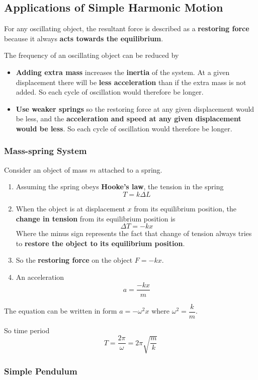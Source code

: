 \subsection{Applications of Simple Harmonic Motion}

For any oscillating object, the resultant force is described as a \textbf{restoring force} because it always \textbf{acts towards the equilibrium}.

The frequency of an oscillating object can be reduced by
\begin{itemize}
    \item \textbf{Adding extra mass} increases the \textbf{inertia} of the system. At a given displacement there will be \textbf{less acceleration} than if the extra mass is not added. So each cycle of oscillation would therefore be longer.
    \item \textbf{Use weaker springs} so the restoring force at any given displacement would be less, and the \textbf{acceleration and speed at any given displacement would be less}. So each cycle of oscillation would therefore be longer.
\end{itemize}

\subsubsection*{Mass-spring System}

Consider an object of mass $m$ attached to a spring.
\begin{enumerate}
    \item Assuming the spring obeys \textbf{Hooke's law}, the tension in the spring
        $$T=k\Delta L$$
    \item When the object is at displacement $x$ from its equilibrium position, the \textbf{change in tension} from its equilibrium position is
        $$\Delta T=-kx$$
        Where the minus sign represents the fact that change of tension always tries to \textbf{restore the object to its equilibrium position}.
    \item So the \textbf{restoring force} on the object $F=-kx$.
    \item An acceleration
        $$a=\frac{-kx}{m}$$
\end{enumerate}

The equation can be written in form $a=-\omega^2x$ where $\omega^2=\dfrac{k}{m}$.

So time period
$$T=\frac{2\pi}{\omega}=2\pi\sqrt{\frac{m}{k}}$$

\subsubsection*{Simple Pendulum}

